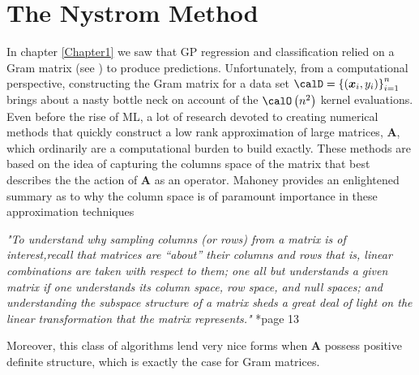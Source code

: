 \section{The Nystrom Method}\label{Chapter2}
In chapter \ref{Chapter1} we saw that GP regression and classification relied on a Gram matrix (see ) to produce predictions. Unfortunately, from a computational perspective, constructing the Gram matrix for a data set $\calD = \left\{ \left( \bm{x}_i , y_{i} \right) \right\}_{i=1}^{n}$ brings about a nasty bottle neck on account of the $\calO \left( n^2 \right)$ kernel evaluations. Even before the rise of ML, a lot of research devoted to creating numerical methods that quickly construct a low rank approximation of large matrices, $\bm{A}$, which ordinarily are a computational burden to build exactly. These methods are based on the idea of capturing the columns space of the matrix that best describes the the action of $\bm{A}$ as an operator. Mahoney provides an enlightened summary as to why the column space is of paramount importance in these approximation techniques
\begin{center}
    \emph{"To understand why sampling columns (or rows) from a matrix is of interest,recall that matrices are “about” their columns and rows that is, linear combinations are taken with respect to them; one all but understands a given matrix if one understands its column space, row space, and null
        spaces; and understanding the subspace structure of a matrix sheds a great deal of light on the linear transformation that the matrix represents."} \cite{DBLP:journals/corr/abs-1104-5557}*{page 13}
\end{center}
Moreover, this class of algorithms lend very nice forms when $\bm{A}$ possess positive definite structure, which is exactly the case for Gram matrices.







